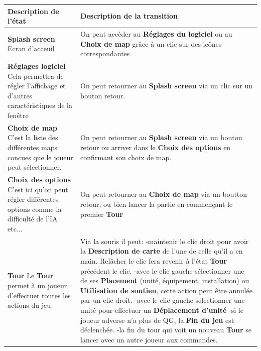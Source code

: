 \begin{tabularx}{15 cm}{|X|X|}

\hline

\textbf{Description de l'état}  &  \textbf{Description de la transition} \\
\hline



\textbf{Splash screen} \newline Ecran d'acceuil & On peut accèder au \textbf{ Réglages du logiciel} ou au \textbf{Choix de map} grâce à un clic sur des icônes correspondantes \\
\hline
\textbf{Réglages logiciel} \newline Cela permettra de régler l'affichage et d'autres caractéristiques de la fenêtre & On peut retourner au \textbf{ Splash screen} via un clic sur un bouton retour. \\
\hline

\hline
\textbf{Choix de map} \newline C'est la liste des différentes maps concues que le joueur peut sélectionner. & On peut retourner au \textbf{ Splash screen} via un bouton retour ou arriver dans le \textbf{Choix des options} en confirmant son choix de map. \\
\hline
\textbf{Choix des options} \newline C'est ici qu'on peut régler différentes options comme la difficulté de l'IA etc... & On peut retourner au \textbf{ Choix de map } via un boutton retour, ou bien lancer la partie en commençant le premier \textbf{ Tour} \\
\hline
\textbf{Tour} \newline Le \textbf{Tour} permet à un joueur d'effectuer toutes les actions du jeu & 
Via la souris il peut: 
\newline -maintenir le clic droit pour avoir la \textbf{Description de carte} de l'une de celle qu'il a en main. Relâcher le clic fera revenir à l'état \textbf{Tour} précédent le clic.
\newline -avec le clic gauche sélectionner une de ses \textbf{Placement} (unité, équipement, installation) ou \textbf{Utilisation de soutien}, cette action peut être annulée par un clic droit. 
\newline -avec le clic gauche sélectionner une unité pour effectuer un \textbf{Déplacement d'unité} 
\newline -si le joueur adverse n'a plus de QG, la \textbf{Fin du jeu} est déclenchée.
\newline -la fin du tour qui voit un nouveau \textbf{Tour} se lancer avec un autre joueur aux commandes. \\



\end{tabularx}
